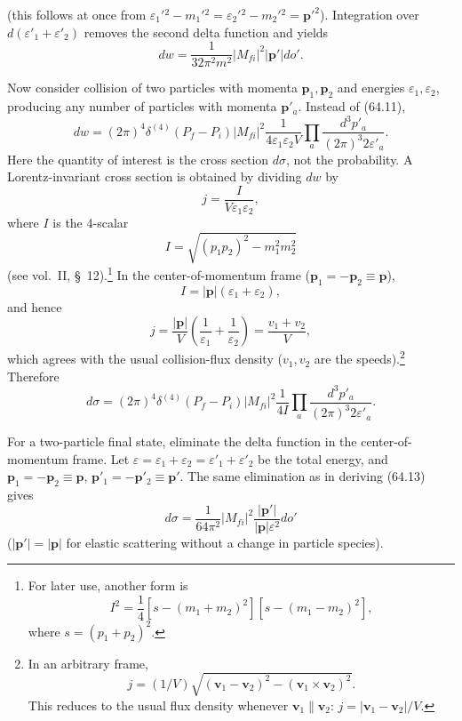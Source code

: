(this follows at once from $\varepsilon_1'{}^2-m_1'{}^2=\varepsilon_2'{}^2-m_2'{}^2=\mathbf p'^2$). Integration over $d(\varepsilon'_1+\varepsilon'_2)$ removes the second delta function and yields
\begin{equation}
dw=\frac1{32\pi^2m^2}|M_{fi}|^2|\mathbf p'|do'.
\tag{64.13}
\end{equation}

Now consider collision of two particles with momenta $\mathbf p_1,\mathbf p_2$ and energies $\varepsilon_1,\varepsilon_2$, producing any number of particles with momenta $\mathbf p'_a$. Instead of (64.11),
\[
dw=(2\pi)^4\delta^{(4)}(P_f-P_i)|M_{fi}|^2\frac1{4\varepsilon_1\varepsilon_2V}
\prod_a\frac{d^3p'_a}{(2\pi)^3 2\varepsilon'_a}.
\]
Here the quantity of interest is the cross section $d\sigma$, not the probability. A Lorentz-invariant cross section is obtained by dividing $dw$ by
\begin{equation}
j=\frac{I}{V\varepsilon_1\varepsilon_2},
\tag{64.14}
\end{equation}
where $I$ is the 4-scalar
\begin{equation}
I=\sqrt{(p_1p_2)^2-m_1^2m_2^2}
\tag{64.15}
\end{equation}
(see vol.~II, \S~12).\footnote{For later use, another form is
\begin{equation}
I^2=\frac14[s-(m_1+m_2)^2][s-(m_1-m_2)^2],
\tag{64.15a}
\end{equation}
where $s=(p_1+p_2)^2$.} In the center-of-momentum frame ($\mathbf p_1=-\mathbf p_2\equiv\mathbf p$),
\begin{equation}
I=|\mathbf p|(\varepsilon_1+\varepsilon_2),
\tag{64.16}
\end{equation}
and hence
\begin{equation}
j=\frac{|\mathbf p|}{V}\left(\frac1{\varepsilon_1}+\frac1{\varepsilon_2}\right)=\frac{v_1+v_2}{V},
\tag{64.17}
\end{equation}
which agrees with the usual collision-flux density ($v_1,v_2$ are the speeds).\footnote{In an arbitrary frame,
\[
j=(1/V)\sqrt{(\mathbf v_1-\mathbf v_2)^2-(\mathbf v_1\times\mathbf v_2)^2}.
\]
This reduces to the usual flux density whenever $\mathbf v_1\parallel\mathbf v_2$: $j=|\mathbf v_1-\mathbf v_2|/V$.} Therefore
\begin{equation}
d\sigma=(2\pi)^4\delta^{(4)}(P_f-P_i)|M_{fi}|^2\frac1{4I}
\prod_a\frac{d^3p'_a}{(2\pi)^3 2\varepsilon'_a}.
\tag{64.18}
\end{equation}

For a two-particle final state, eliminate the delta function in the center-of-momentum frame. Let $\varepsilon=\varepsilon_1+\varepsilon_2=\varepsilon'_1+\varepsilon'_2$ be the total energy, and $\mathbf p_1=-\mathbf p_2\equiv\mathbf p$, $\mathbf p'_1=-\mathbf p'_2\equiv\mathbf p'$. The same elimination as in deriving (64.13) gives
\begin{equation}
d\sigma=\frac1{64\pi^2}|M_{fi}|^2\frac{|\mathbf p'|}{|\mathbf p|\varepsilon^2}do'
\tag{64.19}
\end{equation}
($|\mathbf p'|=|\mathbf p|$ for elastic scattering without a change in particle species).

